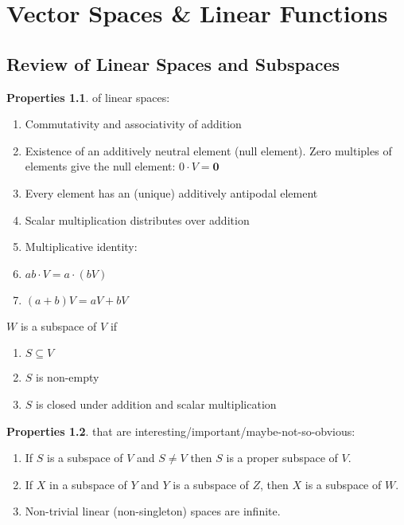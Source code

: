 \documentclass{book}
\theoremstyle{definition}
\newtheorem{prop}{Properties}[section]
\begin{document}
\newpage
\chapter{Vector Spaces \& Linear Functions}
\section{Review of Linear Spaces and Subspaces}
\begin{prop} of linear spaces:
\begin{enumerate}
	\item Commutativity and associativity of addition
	\item Existence of an additively neutral element (null element). Zero multiples of elements give the null element: $0\cdot V = \mathbf{0}$\\
	\item Every element has an (unique) additively antipodal element
	\item Scalar multiplication distributes over addition
	\item Multiplicative identity: 
	\item $ab\cdot V = a\cdot(bV)$
	\item $(a+b)V = aV + bV$
\end{enumerate}
\end{prop}
$W$ is a subspace of $V$ if
\begin{enumerate}
	\item $S \subseteq V$ 
	\item $S$ is non-empty
	\item $S$ is closed under addition and scalar multiplication
\end{enumerate}
\begin{prop} that are interesting/important/maybe-not-so-obvious:
\begin{enumerate}
	\item If $S$ is a subspace of $V$ and $S \neq V$ then $S$ is a proper subspace of $V$.
	\item If $X$ in a subspace of $Y$ and $Y$ is a subspace of $Z$, then $X$ is a subspace of $W$.
	\item Non-trivial linear (non-singleton) spaces are infinite. 
\end{enumerate}
\end{prop}
\end{document}

